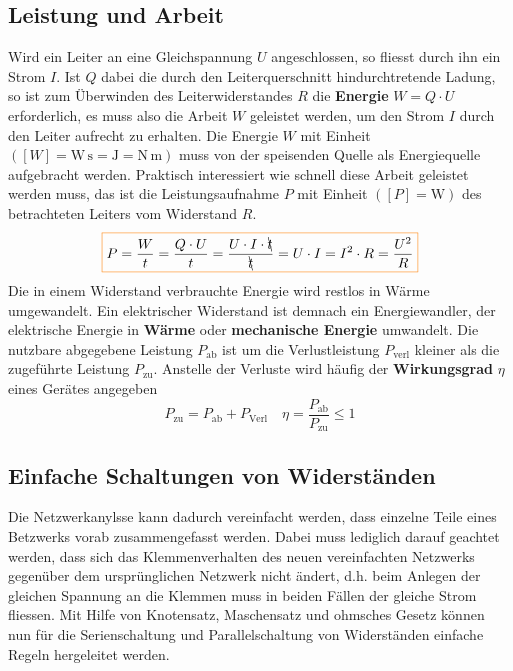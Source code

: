 \subsection{Leistung und Arbeit}
Wird ein Leiter an eine Gleichspannung $U$ angeschlossen, so fliesst durch ihn ein Strom $I$. Ist $Q$ dabei die durch den Leiterquerschnitt hindurchtretende Ladung, so ist zum Überwinden des Leiterwiderstandes $R$ die \textbf{Energie} $W=Q\cdot U$ erforderlich, es muss also die Arbeit $W$ geleistet werden, um den Strom $I$ durch den Leiter aufrecht zu erhalten.
\newline\newline
Die Energie $W$ mit Einheit $\left([W]=\text{W}\,\text{s}=\text{J}=\text{N}\,\text{m}\right)$ muss von der speisenden Quelle als Energiequelle aufgebracht werden. Praktisch interessiert wie schnell diese Arbeit geleistet werden muss, das ist die Leistungsaufnahme $P$ mit Einheit $\left([P]=\text{W}\right)$ des betrachteten Leiters vom Widerstand $R$.
\begin{equation}
\boxed{P=\dfrac{W}{t}=\dfrac{Q\cdot U}{t}=\dfrac{U\cdot I\cdot \bcancel{t}}{\bcancel{t}}=U\cdot I=I^2\cdot R=\dfrac{U^2}{R}}
\end{equation}
Die in einem Widerstand verbrauchte Energie wird restlos in Wärme umgewandelt. Ein elektrischer Widerstand ist demnach ein Energiewandler, der elektrische Energie in \textbf{Wärme} oder \textbf{mechanische Energie} umwandelt.
\newline\newline
Die nutzbare abgegebene Leistung $P_{\text{ab}}$ ist um die Verlustleistung $P_{\text{verl}}$ kleiner als die zugeführte Leistung $P_{\text{zu}}$. Anstelle der Verluste wird häufig der \textbf{Wirkungsgrad} $\eta$ eines Gerätes angegeben
\begin{equation}
\boxed{P_{\text{zu}}=P_{\text{ab}}+P_{\text{Verl}}}\quad \boxed{\eta=\dfrac{P_{\text{ab}}}{P_{\text{zu}}}\leq 1}
\end{equation}
\subsection{Einfache Schaltungen von Widerständen}
Die Netzwerkanylsse kann dadurch vereinfacht werden, dass einzelne Teile eines Betzwerks vorab zusammengefasst werden. Dabei muss lediglich darauf geachtet werden, dass sich das Klemmenverhalten des neuen vereinfachten Netzwerks gegenüber dem ursprünglichen Netzwerk nicht ändert, d.h. beim Anlegen der gleichen Spannung an die Klemmen muss in beiden Fällen der gleiche Strom fliessen.
\newline\newline
Mit Hilfe von Knotensatz, Maschensatz und ohmsches Gesetz können nun für die Serienschaltung und Parallelschaltung von Widerständen einfache Regeln hergeleitet werden.
